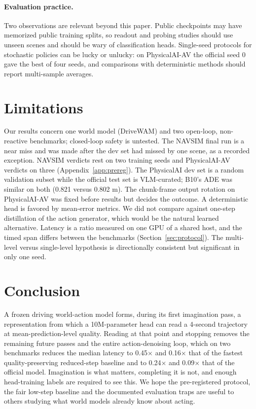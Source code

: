 \documentclass[10pt]{article}
\begin{document}
\paragraph{Evaluation practice.} Two observations are relevant beyond this paper. Public checkpoints may have memorized public training splits, so readout and probing studies should use unseen scenes and should be wary of classification heads. Single-seed protocols for stochastic policies can be lucky or unlucky: on PhysicalAI-AV the official seed 0 gave the best of four seeds, and comparisons with deterministic methods should report multi-sample averages.

\section{Limitations}
\label{sec:limitations}

Our results concern one world model (DriveWAM) and two open-loop, non-reactive benchmarks; closed-loop safety is untested. The NAVSIM final run is a near miss and was made after the dev set had missed by one scene, as a recorded exception. NAVSIM verdicts rest on two training seeds and PhysicalAI-AV verdicts on three (Appendix~\ref{app:prereg}). The PhysicalAI dev set is a random validation subset while the official test set is VLM-curated; B10's ADE was similar on both (0.821 versus 0.802 m). The chunk-frame output rotation on PhysicalAI-AV was fixed before results but decides the outcome. A deterministic head is favored by mean-error metrics. We did not compare against one-step distillation of the action generator, which would be the natural learned alternative. Latency is a ratio measured on one GPU of a shared host, and the timed span differs between the benchmarks (Section~\ref{sec:protocol}). The multi-level versus single-level hypothesis is directionally consistent but significant in only one seed.

\section{Conclusion}
\label{sec:conclusion}

A frozen driving world-action model forms, during its first imagination pass, a representation from which a 10M-parameter head can read a 4-second trajectory at mean-prediction-level quality. Reading at that point and stopping removes the remaining future passes and the entire action-denoising loop, which on two benchmarks reduces the median latency to 0.45$\times$ and 0.16$\times$ that of the fastest quality-preserving reduced-step baseline and to 0.24$\times$ and 0.09$\times$ that of the official model. Imagination is what matters, completing it is not, and enough head-training labels are required to see this. We hope the pre-registered protocol, the fair low-step baseline and the documented evaluation traps are useful to others studying what world models already know about acting.
\end{document}
